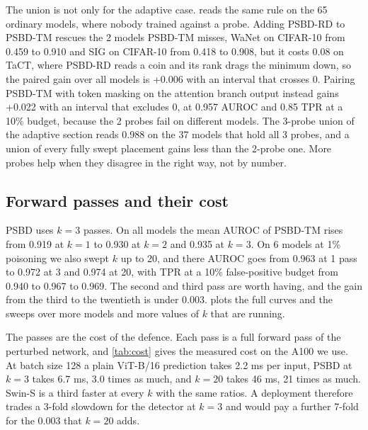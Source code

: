 The union is not only for the adaptive case.  reads the same rule on the 65 ordinary models, where nobody trained against a probe. Adding PSBD-RD to PSBD-TM rescues the 2 models PSBD-TM misses, WaNet on CIFAR-10 from 0.459 to 0.910 and SIG on CIFAR-10 from 0.418 to 0.908, but it costs 0.08 on TaCT, where PSBD-RD reads a coin and its rank drags the minimum down, so the paired gain over all models is +0.006 with an interval that crosses 0. Pairing PSBD-TM with token masking on the attention branch output instead gains +0.022 with an interval that excludes 0, at 0.957 AUROC and 0.85 TPR at a 10\% budget, because the 2 probes fail on different models. The 3-probe union of the adaptive section reads 0.988 on the 37 models that hold all 3 probes, and a union of every fully swept placement gains less than the 2-probe one. More probes help when they disagree in the right way, not by number.


\subsection{Forward passes and their cost}
\label{sec:robustness:passes}

PSBD uses $k = 3$ passes. On all models the mean AUROC of PSBD-TM rises from 0.919 at $k = 1$ to 0.930 at $k = 2$ and 0.935 at $k = 3$. On 6 models at 1\% poisoning we also swept $k$ up to 20, and there AUROC goes from 0.963 at 1 pass to 0.972 at 3 and 0.974 at 20, with TPR at a 10\% false-positive budget from 0.940 to 0.967 to 0.969. The second and third pass are worth having, and the gain from the third to the twentieth is under 0.003.  plots the full curves and the sweeps over more models and more values of $k$ that are running.


The passes are the cost of the defence. Each pass is a full forward pass of the perturbed network, and \cref{tab:cost} gives the measured cost on the A100 we use. At batch size 128 a plain ViT-B/16 prediction takes 2.2 ms per input, PSBD at $k = 3$ takes 6.7 ms, 3.0 times as much, and $k = 20$ takes 46 ms, 21 times as much. Swin-S is a third faster at every $k$ with the same ratios. A deployment therefore trades a 3-fold slowdown for the detector at $k = 3$ and would pay a further 7-fold for the 0.003 that $k = 20$ adds.

